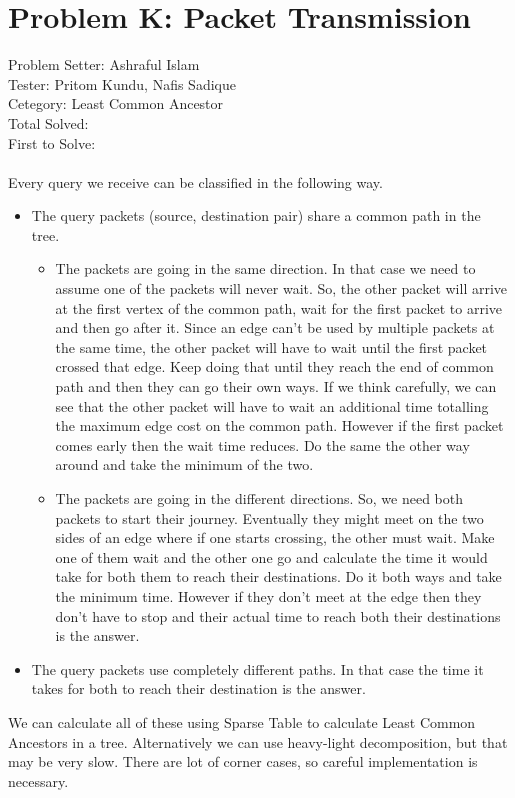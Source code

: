\documentclass[11pt,a4paper]{article}
\begin{document}
\section*{Problem K: Packet Transmission}
Problem Setter: Ashraful Islam \\
Tester: Pritom Kundu, Nafis Sadique \\
Cetegory: Least Common Ancestor \\
Total Solved:  \\
First to Solve: \\
\\
Every query we receive can be classified in the following way.
\begin{itemize}
    \item The query packets (source, destination pair) share a common path in the tree. 
    \begin{itemize}
        \item The packets are going in the same direction. In that case we need to assume one of the
        packets will never wait. So, the other packet will arrive at the first vertex of the common path,
        wait for the first packet to arrive and then go after it. Since an edge can't be used by
        multiple packets at the same time, the other packet will have to wait until the first packet 
        crossed that edge. Keep doing that until they reach the end of common path and then they can 
        go their own ways. If we think carefully, we can see that the other packet will have to wait
        an additional time totalling the maximum edge cost on the common path. However if the first
        packet comes early then the wait time reduces. Do the same the other way around and take
        the minimum of the two.
        \item The packets are going in the different directions. So, we need both packets to start
        their journey. Eventually they might meet on the two sides of an edge where if one starts crossing,
        the other must wait. Make one of them wait and the other one go and calculate the time it would 
        take for both them to reach their destinations. Do it both ways and take the minimum time. However if
        they don't meet at the edge then they don't have to stop and their actual time to reach both 
        their destinations is the answer. 
    \end{itemize}
    \item The query packets use completely different paths. In that case the time it takes for both to reach
    their destination is the answer.
\end{itemize}
We can calculate all of these using Sparse Table to calculate Least Common Ancestors in a tree. Alternatively 
we can use heavy-light decomposition, but that may be very slow. There are lot of corner cases, so careful 
implementation is necessary.
\end{document}
